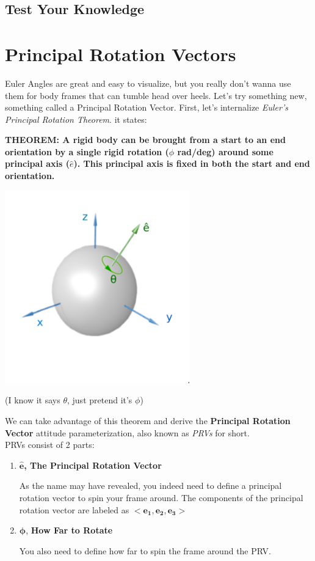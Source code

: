 \documentclass[a4paper,14pt]{extreport}
\begin{document}
\section{Test Your Knowledge}

\chapter{Principal Rotation Vectors}

Euler Angles are great and easy to visualize, but you really don't wanna use them for body frames that can tumble head over heels. Let's try something new, something called a Principal Rotation Vector. First, let's internalize \emph{Euler's Principal Rotation Theorem}. it states:

\begin{center}
\textbf{THEOREM: A rigid body can be brought from a start to an end orientation by a single rigid rotation ($\phi$ rad/deg) around some principal axis ($\hat{e}$). This principal axis is fixed in both the start and end orientation.}
\end{center}

\begin{center}
\includegraphics[width=8cm]{PRV1}

(I know it says $\theta$, just pretend it's $\phi$)
\end{center}

We can take advantage of this theorem and derive the \textbf{Principal Rotation Vector} attitude parameterization, also known as \emph{PRVs} for short.\\

PRVs consist of 2 parts:
\begin{enumerate}
\item{\textbf{$\mathbf{\hat{e}}$, The Principal Rotation Vector}

As the name may have revealed, you indeed need to define a principal rotation vector to spin your frame around. The components of the principal rotation vector are labeled as $\mathbf{<e_1, e_2, e_3>}$ }

\item{$\mathbf{\phi}$, \textbf{How Far to Rotate}

You also need to define how far to spin the frame around the PRV.}
\end{enumerate}
\end{document}
